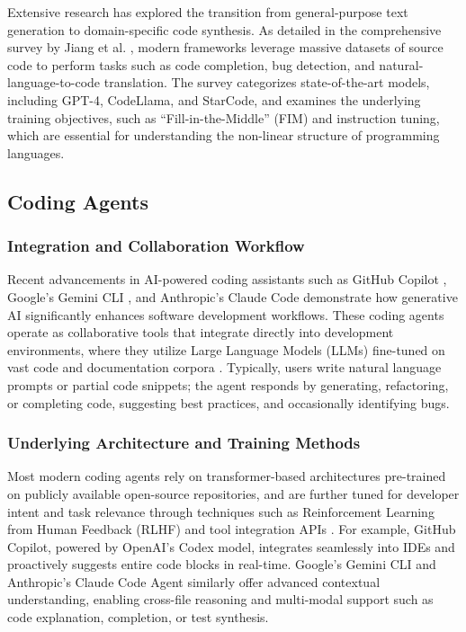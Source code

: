 Extensive research has explored the transition from general-purpose text generation to domain-specific code synthesis. As detailed in the comprehensive survey by Jiang et al. \cite{Jiang_2026}, modern frameworks leverage massive datasets of source code to perform tasks such as code completion, bug detection, and natural-language-to-code translation. The survey categorizes state-of-the-art models, including GPT-4, CodeLlama, and StarCode, and examines the underlying training objectives, such as ``Fill-in-the-Middle'' (FIM) and instruction tuning, which are essential for understanding the non-linear structure of programming languages.

\subsection{Coding Agents}

\subsubsection{Integration and Collaboration Workflow}
Recent advancements in AI-powered coding assistants such as GitHub Copilot \cite{copilot}, Google's Gemini CLI \cite{geminicli}, and Anthropic's Claude Code \cite{claudeCodeAgent} demonstrate how generative AI significantly enhances software development workflows. These coding agents operate as collaborative tools that integrate directly into development environments, where they utilize Large Language Models (LLMs) fine-tuned on vast code and documentation corpora \cite{yang2025codefoundationmodelsagents}. Typically, users write natural language prompts or partial code snippets; the agent responds by generating, refactoring, or completing code, suggesting best practices, and occasionally identifying bugs.

\subsubsection{Underlying Architecture and Training Methods}
Most modern coding agents rely on transformer-based architectures pre-trained on publicly available open-source repositories, and are further tuned for developer intent and task relevance through techniques such as Reinforcement Learning from Human Feedback (RLHF) and tool integration APIs \cite{yang2025codefoundationmodelsagents}. For example, GitHub Copilot, powered by OpenAI's Codex model, integrates seamlessly into IDEs and proactively suggests entire code blocks in real-time. Google's Gemini CLI and Anthropic's Claude Code Agent similarly offer advanced contextual understanding, enabling cross-file reasoning and multi-modal support such as code explanation, completion, or test synthesis.

